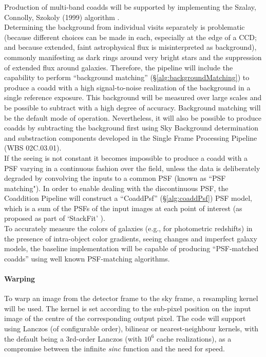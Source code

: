 \documentclass[12pt]{article}
\newcommand{\wbsSFM}{WBS 02C.03.01}
\begin{document}
Production of multi-band coadds will be supported by implementing the Szalay, Connolly, Szokoly (1999) algorithm \cite{Szalay99}. %
\\

Determining the background from individual visits separately is problematic (because different choices can be made in each, especially at the edge of a CCD; and because extended, faint astrophysical flux is misinterpreted as background), commonly manifesting as dark rings around very bright stars and the suppression of extended flux around galaxies. Therefore, the pipeline will include the capability to perform ``background matching'' (\S\ref{alg:backgroundMatching}) to produce a coadd with a high signal-to-noise realization of the background in a single reference exposure.  This background will be measured over large scales and be possible to subtract with a high degree of accuracy. Background matching will be the default mode of operation. Nevertheless, it will also be possible to produce coadds by subtracting the background first using Sky Background determination and substraction components developed in the Single Frame Processing Pipeline (\wbsSFM).
\\

If the seeing is not constant it becomes impossible to produce a coadd with a PSF varying in a continuous fashion over the field, unless the data is deliberately degraded by convolving the inputs to a common PSF (known as ``PSF matching").  In order to enable dealing with the discontinuous PSF, the Coaddition Pipeline will construct a ``CoaddPsf'' (\S\ref{alg:coaddPsf}) PSF model, which is a sum of the PSFs of the input images at each point of interest (as proposed as part of `StackFit' \cite{Jee13}).
\\

To accurately measure the colors of galaxies (e.g., for photometric redshifts) in the presence of intra-object color gradients, seeing changes and imperfect galaxy models, the baseline implementation will be capable of producing ``PSF-matched coadds'' using well known PSF-matching algorithms.

\paragraph{Warping}
\label{alg:warp}
To warp an image from the detector frame to the sky frame, a resampling kernel will be used. The kernel is set according to the sub-pixel position on the input image of the centre of the corresponding output pixel.  The code will support using Lanczos (of configurable order), bilinear or nearest-neighbour kernels, with the default being a 3rd-order Lanczos (with $10^6$ cache realizations), as a compromise between the infinite {\em sinc} function and the need for speed. %
\end{document}
